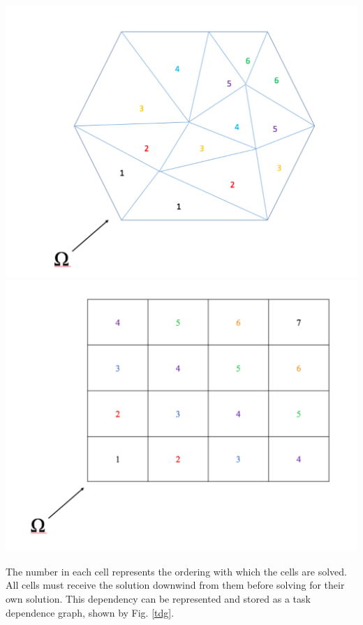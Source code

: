 \documentclass[11pt, letterpaper,titlepage,oneside]{article}
\begin{document}
\noindent\begin{minipage}{\textwidth}
\centering
\includegraphics[scale = 0.27]{UnstructureMesh.pdf}
\includegraphics[scale = 0.27]{StructuredMesh.pdf}
\label{sweeps}
\end{minipage}
\smallskip

The number in each cell represents the ordering with which the cells are solved. All cells must receive the solution downwind from them before solving for their own solution. This dependency can be represented and stored as a task dependence graph, shown by Fig. \ref{tdg}.
\end{document}
